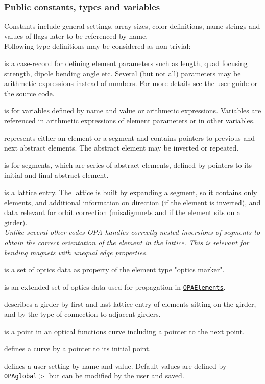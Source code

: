 \documentclass[12pt]{article}
\newcommand\code[1]{{\tt #1}}
\newcommand{\unico}[1]{{\color{burntorange}\code{#1}}}
\newcommand{\prcod}[2]{\opauni{#1}$>$\unico{#2}}
\newcommand{\opauni}[1]{\colorbox{orange!30}{\code{#1}}}
\newcommand{\ouni}[1]{\hyperref[#1]{\opauni{#1}}}
\newcommand{\pvar}[1]{\subsubsection*{Public constants, types and variables} #1}
\newcommand{\feature}[1]{{\color{cadmiumgreen}\em #1}}
\begin{document}
\pvar{
Constants include general settings, array sizes, color definitions, name strings and values of flags later to be referenced by name.\\

Following type definitions may be considered as non-trivial:

\unico{ElementType} is a case-record for defining element parameters such as length, quad focusing strength, dipole bending angle etc. Several (but not all) parameters may be arithmetic expressions instead of numbers. For more details see the user guide \cite{userguide} or the source code. 

\unico{variable\_type} is for variables defined by name and value or arithmetic expressions. Variables are referenced in arithmetic expressions of element parameters or in other variables.

\unico{AbstractEleType} represents either an element or a segment and contains pointers to previous and next abstract elements. The abstract element may be inverted or repeated.

\unico{SegmentType} is for segments, which are series of abstract elements, defined by pointers to its initial and final abstract element.

\unico{LatticeType} is a lattice entry. The lattice is built by expanding a segment, so it contains only elements, and additional information on direction (if the element is inverted), and data relevant for orbit correction (misaligmnets and if the element sits on a girder). \\
\feature{Unlike several other codes OPA handles correctly nested inversions of segments to obtain the correct orientation of the element in the lattice. This is relevant for bending magnets with unequal edge properties.}

\unico{OmarkType} is a set of optics data as property of the element type "optics marker".

\unico{OpValType} is an extended set of optics data used for propagation in \ouni{OPAElements}.

\unico{GirderType} describes a girder by first and last lattice entry of elements sitting on the girder, and by the type of connection to adjacent girders.

\unico{CurveType} is a point in an optical functions curve including a pointer to the next point.

\unico{CurvePlotType} defines a curve by a pointer to its initial point.

\unico{DefaultType} defines a user setting by name and value. Default values are defined by \\ \prcod{OPAglobal}{Initialization} but can be modified by the user and saved.

}
\end{document}
